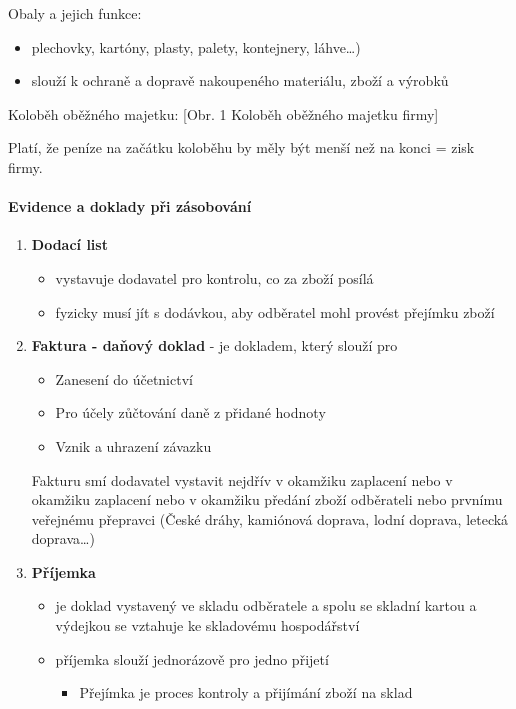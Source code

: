 Obaly a jejich funkce:
\begin{itemize}
    \item plechovky, kartóny, plasty, palety, kontejnery, láhve\ldots)
    \item slouží k ochraně a dopravě nakoupeného materiálu, zboží a výrobků
\end{itemize}

Koloběh oběžného majetku:
[Obr. 1 Koloběh oběžného majetku firmy]

Platí, že peníze na začátku koloběhu by měly být menší než na konci = zisk firmy.

\paragraph*{Evidence a doklady při zásobování}
\begin{enumerate}
    \item \textbf{Dodací list}
        \begin{itemize}
            \item vystavuje dodavatel pro kontrolu, co za zboží posílá
            \item fyzicky musí jít s dodávkou, aby odběratel mohl provést přejímku zboží
        \end{itemize}
    \item \textbf{Faktura - daňový doklad} - je dokladem, který slouží pro
        \begin{itemize}
            \item Zanesení do účetnictví
            \item Pro účely zůčtování daně z přidané hodnoty
            \item Vznik a uhrazení závazku
        \end{itemize}
        Fakturu smí dodavatel vystavit nejdřív v okamžiku zaplacení nebo v okamžiku zaplacení nebo v okamžiku předání zboží odběrateli nebo prvnímu veřejnému přepravci (České dráhy, kamiónová doprava, lodní doprava, letecká doprava\ldots)
    \item \textbf{Příjemka}
        \begin{itemize}
            \item je doklad vystavený ve skladu odběratele a spolu se skladní kartou a výdejkou se vztahuje ke skladovému hospodářství
            \item příjemka slouží jednorázově pro jedno přijetí
                \begin{itemize}
                    \item Přejímka je proces kontroly a přijímání zboží na sklad

\end{itemize}
\end{itemize}
\end{enumerate}
